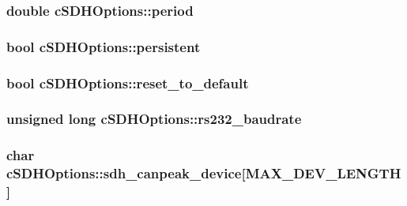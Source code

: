 \hypertarget{classcSDHOptions_a62f70e83e50968e9cdee7b55cff12806}{
\subsubsection[{period}]{\setlength{\rightskip}{0pt plus 5cm}double {\bf c\-S\-D\-H\-Options\-::period}}}\label{classcSDHOptions_a62f70e83e50968e9cdee7b55cff12806}
\hypertarget{classcSDHOptions_aca724e741552d1a6c415abf6a0bf2ecf}{
\subsubsection[{persistent}]{\setlength{\rightskip}{0pt plus 5cm}bool {\bf c\-S\-D\-H\-Options\-::persistent}}}\label{classcSDHOptions_aca724e741552d1a6c415abf6a0bf2ecf}
\hypertarget{classcSDHOptions_afedb88e59b2ecf58b80c7b0b861ee189}{
\subsubsection[{reset\-\_\-to\-\_\-default}]{\setlength{\rightskip}{0pt plus 5cm}bool {\bf c\-S\-D\-H\-Options\-::reset\-\_\-to\-\_\-default}}}\label{classcSDHOptions_afedb88e59b2ecf58b80c7b0b861ee189}
\hypertarget{classcSDHOptions_a38c8ae82f4fa578b04d1a9b9fffbe063}{
\subsubsection[{rs232\-\_\-baudrate}]{\setlength{\rightskip}{0pt plus 5cm}unsigned long {\bf c\-S\-D\-H\-Options\-::rs232\-\_\-baudrate}}}\label{classcSDHOptions_a38c8ae82f4fa578b04d1a9b9fffbe063}
\hypertarget{classcSDHOptions_acd04aeab5f6ab8e962b739de10bf4d08}{
\subsubsection[{sdh\-\_\-canpeak\-\_\-device}]{\setlength{\rightskip}{0pt plus 5cm}char {\bf c\-S\-D\-H\-Options\-::sdh\-\_\-canpeak\-\_\-device}\mbox{[}{\bf \-M\-A\-X\-\_\-\-D\-E\-V\-\_\-\-L\-E\-N\-G\-T\-H}\mbox{]}}}\label{classcSDHOptions_acd04aeab5f6ab8e962b739de10bf4d08}

